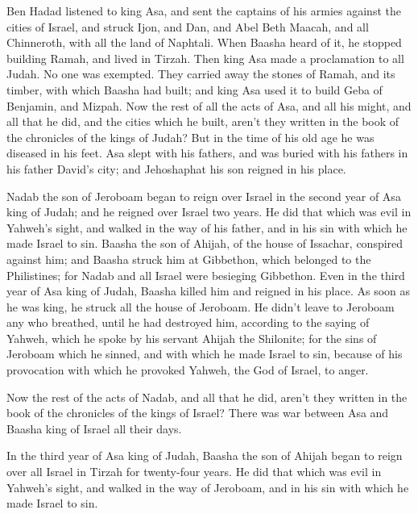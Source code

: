  Ben Hadad listened to king Asa, and sent the captains of
his armies against the cities of Israel, and struck Ijon, and Dan, and
Abel Beth Maacah, and all Chinneroth, with all the land of Naphtali.
 When Baasha heard of it, he stopped building Ramah, and
lived in Tirzah.  Then king Asa made a proclamation to
all Judah. No one was exempted. They carried away the stones of Ramah,
and its timber, with which Baasha had built; and king Asa used it to
build Geba of Benjamin, and Mizpah.  Now the rest of all
the acts of Asa, and all his might, and all that he did, and the cities
which he built, aren't they written in the book of the chronicles of the
kings of Judah? But in the time of his old age he was diseased in his
feet.  Asa slept with his fathers, and was buried with
his fathers in his father David's city; and Jehoshaphat his son reigned
in his place.

 Nadab the son of Jeroboam began to reign over Israel in
the second year of Asa king of Judah; and he reigned over Israel two
years.  He did that which was evil in Yahweh's sight, and
walked in the way of his father, and in his sin with which he made
Israel to sin.  Baasha the son of Ahijah, of the house of
Issachar, conspired against him; and Baasha struck him at Gibbethon,
which belonged to the Philistines; for Nadab and all Israel were
besieging Gibbethon.  Even in the third year of Asa king
of Judah, Baasha killed him and reigned in his place.  As
soon as he was king, he struck all the house of Jeroboam. He didn't
leave to Jeroboam any who breathed, until he had destroyed him,
according to the saying of Yahweh, which he spoke by his servant Ahijah
the Shilonite;  for the sins of Jeroboam which he sinned,
and with which he made Israel to sin, because of his provocation with
which he provoked Yahweh, the God of Israel, to anger.

 Now the rest of the acts of Nadab, and all that he did,
aren't they written in the book of the chronicles of the kings of
Israel?  There was war between Asa and Baasha king of
Israel all their days.

 In the third year of Asa king of Judah, Baasha the son
of Ahijah began to reign over all Israel in Tirzah for twenty-four
years.  He did that which was evil in Yahweh's sight, and
walked in the way of Jeroboam, and in his sin with which he made Israel
to sin.

